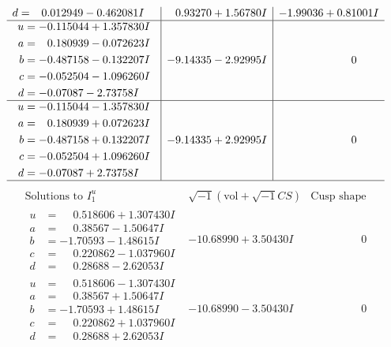 \documentclass[1p]{elsarticle_modified}
\theoremstyle{definition}
\newcommand{\I}{\sqrt{-1}}
\begin{document}
$$\begin{array}{c|c|c}
\begin{aligned}
d &= \phantom{-}0.012949 - 0.462081 I\end{aligned}
 & \phantom{-}0.93270 + 1.56780 I & -1.99036 + 0.81001 I \\ \hline\begin{aligned}
u &= -0.115044 + 1.357830 I \\
a &= \phantom{-}0.180939 - 0.072623 I \\
b &= -0.487158 - 0.132207 I \\
c &= -0.052504 - 1.096260 I \\
d &= -0.07087 - 2.73758 I\end{aligned}
 & -9.14335 - 2.92995 I & \phantom{-0.000000 } 0 \\ \hline\begin{aligned}
u &= -0.115044 - 1.357830 I \\
a &= \phantom{-}0.180939 + 0.072623 I \\
b &= -0.487158 + 0.132207 I \\
c &= -0.052504 + 1.096260 I \\
d &= -0.07087 + 2.73758 I\end{aligned}
 & -9.14335 + 2.92995 I & \phantom{-0.000000 } 0\\
 \hline 
 \end{array}$$\newpage$$\begin{array}{c|c|c}  
\text{Solutions to }I^u_{1}& \I (\text{vol} + \sqrt{-1}CS) & \text{Cusp shape}\\
 \hline 
\begin{aligned}
u &= \phantom{-}0.518606 + 1.307430 I \\
a &= \phantom{-}0.38567 - 1.50647 I \\
b &= -1.70593 - 1.48615 I \\
c &= \phantom{-}0.220862 - 1.037960 I \\
d &= \phantom{-}0.28688 - 2.62053 I\end{aligned}
 & -10.68990 + 3.50430 I & \phantom{-0.000000 } 0 \\ \hline\begin{aligned}
u &= \phantom{-}0.518606 - 1.307430 I \\
a &= \phantom{-}0.38567 + 1.50647 I \\
b &= -1.70593 + 1.48615 I \\
c &= \phantom{-}0.220862 + 1.037960 I \\
d &= \phantom{-}0.28688 + 2.62053 I\end{aligned}
 & -10.68990 - 3.50430 I & \phantom{-0.000000 } 0 \\ \hline\begin{aligned}

\end{aligned}
\end{array}$$
\end{document}
